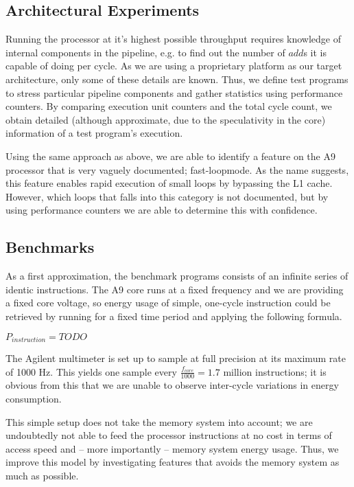 \subsection{Architectural Experiments}
Running the processor at it's highest possible throughput requires knowledge of
internal components in the pipeline, e.g. to find out the number of $add$s it is
capable of doing per cycle. As we are using a proprietary platform as our target
architecture, only some of these details are known. Thus, we define test
programs to stress particular pipeline components and gather statistics using
performance counters. By comparing execution unit counters and the total cycle
count, we obtain detailed (although approximate, due to the speculativity in the
core) information of a test program's execution.

Using the same approach as above, we are able to identify a feature on the A9
processor that is very vaguely documented; fast-loop\texttrademark mode. As the
name suggests, this feature enables rapid execution of small loops by bypassing
the L1 cache.  However, which loops that falls into this category is not
documented, but by using performance counters we are able to determine this with
confidence.


\subsection{Benchmarks}
As a first approximation, the benchmark programs consists of an infinite series
of identic instructions. The A9 core runs at a fixed frequency and we are
providing a fixed core voltage, so energy usage of simple, one-cycle instruction
could be retrieved by running for a fixed time period and applying the following
formula.

\begin{center}
$P_{instruction} = TODO$
\end{center}

The Agilent multimeter is set up to sample at full precision at its maximum rate
of 1000 Hz. This yields one sample every $\frac{ f_{core} }{ 1000 } = 1.7$
million instructions; it is obvious from this that we are unable to observe
inter-cycle variations in energy consumption.

This simple setup does not take the memory system into account; we are
undoubtedly not able to feed the processor instructions at no cost in terms of
access speed and -- more importantly -- memory system energy usage. Thus, we
improve this model by investigating features that avoids the memory system as
much as possible.

